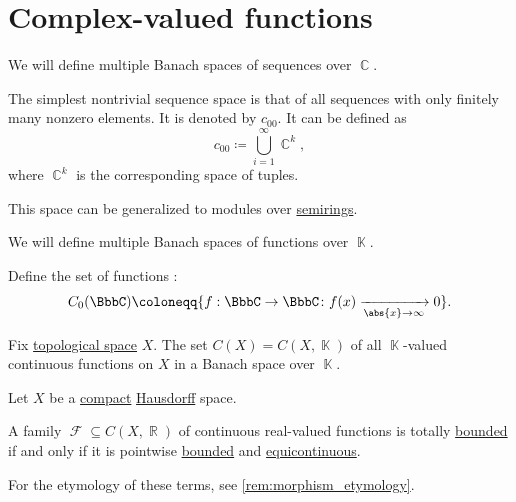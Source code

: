 \section{Complex-valued functions}\label{sec:complex_valued_functions}

\begin{definition}\label{def:sequence_spaces}
  We will define multiple Banach spaces of sequences over \( \BbbC \).

  \begin{thmenum}
     The simplest nontrivial sequence space is that of all sequences with only finitely many nonzero elements. It is denoted by \( c_{00} \). It can be defined as
    \begin{equation*}
      c_{00} \coloneqq \bigcup_{i=1}^\infty \BbbC^k,
    \end{equation*}
    where \( \BbbC^k \) is the corresponding space of tuples.

    This space can be generalized to modules over \hyperref[def:module]{semirings}.
  \end{thmenum}
\end{definition}

\begin{definition}\label{def:function_spaces}
  We will define multiple Banach spaces of functions over \( \BbbK \).

  \begin{thmenum}
     Define the set of functions :
    \begin{equation*}
      C_0(\BbbC) \coloneqq \{ f: \BbbC \to \BbbC \colon f(x) \xrightarrow[\abs{x} \to \infty]{} 0 \}.
    \end{equation*}

     Fix \hyperref[def:topological_space]{topological space} \( X \). The set \( C(X) = C(X, \BbbK) \) of all \( \BbbK \)-valued continuous functions on \( X \) in a Banach space over \( \BbbK \).
  \end{thmenum}
\end{definition}

\begin{theorem}\label{thm:arzela_ascoli}
  Let \( X \) be a \hyperref[def:compact_space]{compact} \hyperref[def:separation_axioms/T2]{Hausdorff} space.

  A family \( \mscrF \subseteq C(X, \BbbR) \) of continuous real-valued functions is totally \hyperref[def:totally_bounded_set]{bounded} if and only if it is pointwise \hyperref[def:bounded_function/pointwise]{bounded} and \hyperref[def:function_set_continuity/equicontinuous]{equicontinuous}.
\end{theorem}

\begin{definition}\label{def:holomorphic_function}
\end{definition}
\begin{comments}
  \item For the etymology of these terms, see \cref{rem:morphism_etymology}.
\end{comments}

\begin{definition}\label{def:biholomorphic_function}
\end{definition}
